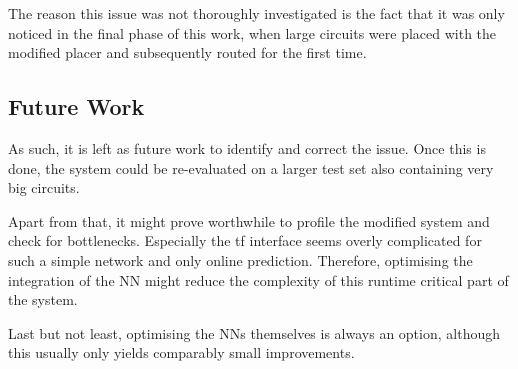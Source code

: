 The reason this issue was not thoroughly investigated is the fact that it was only noticed in the final phase of this work, when large circuits were placed with the modified placer and subsequently routed for the first time.

\subsection{Future Work}

As such, it is left as future work to identify and correct the issue. Once this is done, the system could be re-evaluated on a larger test set also containing very big circuits. 

Apart from that, it might prove worthwhile to profile the modified system and check for bottlenecks. Especially the \gls{tf} interface seems overly complicated for such a simple network and only online prediction. Therefore, optimising the integration of the \gls{NN} might reduce the complexity of this runtime critical part of the system.

Last but not least, optimising the \glspl{NN} themselves is always an option, although this usually only yields comparably small improvements.
